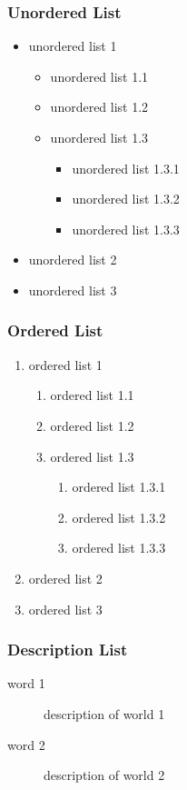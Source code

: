 \documentclass[
    10pt,
    pdf,
    UTF8,
    aspectratio=169
]{beamer}
\begin{document}
\begin{frame}
    \frametitle{Unordered List}
    \begin{itemize}
        \item unordered list 1
        \begin{itemize}
            \item unordered list 1.1
            \item unordered list 1.2
            \item unordered list 1.3
            \begin{itemize}
                \item unordered list 1.3.1
                \item unordered list 1.3.2
                \item unordered list 1.3.3
            \end{itemize}
        \end{itemize}
        \item unordered list 2
        \item unordered list 3
    \end{itemize}
\end{frame}
\begin{frame}
    \frametitle{Ordered List}
    \begin{enumerate}
        \item ordered list 1
        \begin{enumerate}
            \item ordered list 1.1
            \item ordered list 1.2
            \item ordered list 1.3
            \begin{enumerate}
                \item ordered list 1.3.1
                \item ordered list 1.3.2
                \item ordered list 1.3.3
            \end{enumerate}
        \end{enumerate}
        \item ordered list 2
        \item ordered list 3
    \end{enumerate}
\end{frame}
\begin{frame}
    \frametitle{Description List}
    \begin{description}
        \item[word 1] description of world 1
        \item[word 2] description of world 2
    \end{description}
\end{frame}
\end{document}
